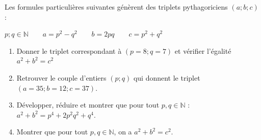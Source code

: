 \begin{exercise}  
Les formules particulières suivantes génèrent des triplets pythagoriciens $(a;b;c)$ : 

$
p;q\in\mathbb{N} \qquad a=p^2-q^2 \qquad b = 2 pq \qquad c = p^2+q^2 
$
	\begin{enumerate}[label=\alph*), leftmargin=*]
		\item Donner le triplet correspondant à $(p=8;q=7)$ et vérifier l'égalité $a^2+b^2=c^2$ 
		\item Retrouver le couple d'entiers $(p;q)$ qui donnent le triplet $(a=35;b=12;c=37)$. 
		\item Développer, réduire et montrer que pour tout $p,q\in\mathbb{N}$ : $a^2+b^2=p^4+2p^2q^2+q^4$.
		\item  Montrer que pour tout $p,q\in\mathbb{N}$, on a  $a^2+b^2=c^2$.
	\end{enumerate}
\end{exercise}
 
%	 

